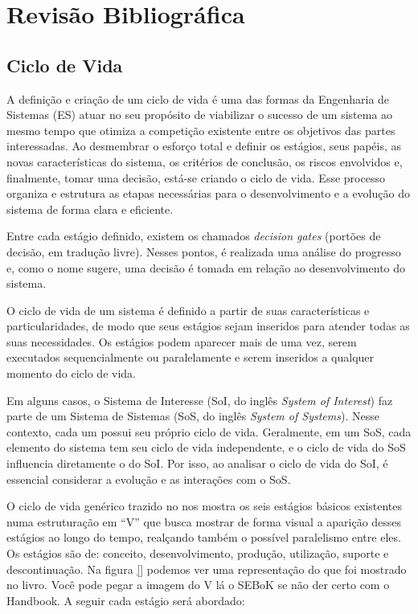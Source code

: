 
\chapter{Revisão Bibliográfica}\label{chap:revisao}

\section{Ciclo de Vida}\label{sec:revisao:ciclodevida}

	A definição e criação de um ciclo de vida é uma das formas da Engenharia de Sistemas (ES) atuar no seu propósito de viabilizar o sucesso de um sistema ao
	mesmo tempo que otimiza a competição existente entre os objetivos das partes interessadas. Ao desmembrar o esforço total e definir os estágios, seus papéis, as novas características do sistema, os critérios de conclusão, os riscos envolvidos e, finalmente, tomar uma decisão, está-se criando o ciclo de vida. Esse processo organiza e estrutura as etapas necessárias para o desenvolvimento e a evolução do sistema de forma clara e eficiente.

	Entre cada estágio definido, existem os chamados \textit{decision gates} (portões de decisão, em tradução livre). Nesses pontos, é realizada uma análise do progresso e, como o nome sugere, uma decisão é tomada em relação ao desenvolvimento do sistema.

	O ciclo de vida de um sistema é definido a partir de suas características e particularidades, de modo que seus estágios sejam inseridos para atender todas as suas
	necessidades. Os estágios podem aparecer mais de uma vez, serem executados sequencialmente ou paralelamente e serem inseridos a qualquer momento do ciclo de vida.

	Em alguns casos, o Sistema de Interesse (SoI, do inglês \textit{System of Interest}) faz parte de um Sistema de Sistemas (SoS, do inglês \textit{System of Systems}). Nesse contexto, cada um possui seu próprio ciclo de vida. Geralmente, em um SoS, cada elemento do sistema tem seu ciclo de vida independente, e o ciclo de vida do SoS influencia diretamente o do SoI. Por isso, ao analisar o ciclo de vida do SoI, é essencial considerar a evolução e as interações com o SoS.

	O ciclo de vida genérico trazido no \cite{incoseHandbook} nos mostra os seis estágios básicos existentes numa estruturação em ``V'' que busca mostrar de forma visual a aparição desses estágios
	ao longo do tempo, realçando também o possível paralelismo entre eles. Os estágios são de: conceito, desenvolvimento, produção, utilização, suporte e descontinuação. Na figura \ref{} podemos ver uma representação do que foi mostrado no livro. {\color{red} Você pode pegar a imagem do V lá o SEBoK se não der certo com o Handbook.} A seguir cada estágio será abordado:

